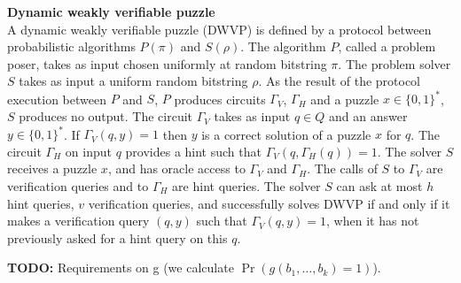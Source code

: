 \begin{definition} {\textbf{Dynamic weakly verifiable puzzle}}\\
  A dynamic weakly verifiable puzzle (DWVP) is defined by a protocol between probabilistic algorithms $P(\pi)$ and $S(\rho)$.
  The algorithm $P$, called a problem poser, takes as input chosen uniformly at random bitstring $\pi$.
  The problem solver $S$ takes as input a uniform random bitstring $\rho$.
  As the result of the protocol execution between $P$ and $S$,
  $P$ produces circuits $\Gamma_{V}$, $\Gamma_{H}$ and a puzzle $x \in \{0,1\}^{*}$, $S$ produces no output.
  The circuit $\Gamma_{V}$ takes as input $q \in Q$ and an answer $y \in \{0,1\}^*$.
  If $\Gamma_V(q,y) = 1$ then $y$ is a correct solution of a puzzle $x$ for $q$.
  The circuit $\Gamma_H$ on input $q$ provides a hint such that $\Gamma_V(q,\Gamma_H(q)) = 1$.
  The solver $S$ receives a puzzle $x$, and has oracle access to $\Gamma_V$ and $\Gamma_H$.
  The calls of $S$ to $\Gamma_V$ are verification queries and to $\Gamma_H$ are hint queries.
  The solver $S$ can ask at most $h$ hint queries, $v$ verification queries, and successfully solves DWVP if and only if
  it makes a verification query $(q,y)$ such that $\Gamma_V(q,y) = 1$, when it has not previously asked for a hint query on this $q$.
\end{definition}
%
\begin{todo}
  \textbf{TODO:} Requirements on g (we calculate $\Pr(g(b_1, \dots, b_k) = 1)$).
\end{todo}
%
